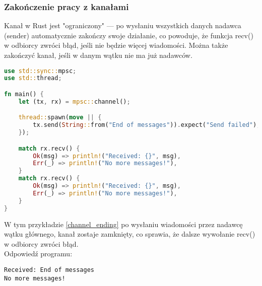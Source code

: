 \subsubsection{Zakończenie pracy z kanałami}
Kanał w Rust jest "ograniczony" — po wysłaniu wszystkich danych nadawca (sender) automatycznie zakończy swoje działanie, co powoduje, że funkcja recv() w odbiorcy zwróci błąd, jeśli nie będzie więcej wiadomości. Można także zakończyć kanał, jeśli w danym wątku nie ma już nadawców.
\begin{lstlisting}[language=Rust, caption=Zakończenie kanału, label=channel_ending]
use std::sync::mpsc;
use std::thread;

fn main() {
    let (tx, rx) = mpsc::channel();

    thread::spawn(move || {
        tx.send(String::from("End of messages")).expect("Send failed");
    });

    match rx.recv() {
        Ok(msg) => println!("Received: {}", msg),
        Err(_) => println!("No more messages!"),
    }
    match rx.recv() {
        Ok(msg) => println!("Received: {}", msg),
        Err(_) => println!("No more messages!"),
    }
}

\end{lstlisting}
W tym przykładzie \ref{channel_ending} po wysłaniu wiadomości przez nadawcę wątku głównego, kanał zostaje zamknięty, co sprawia, że dalsze wywołanie recv() w odbiorcy zwróci błąd.\\
Odpowiedź programu:
\begin{verbatim}
Received: End of messages
No more messages!
\end{verbatim}


